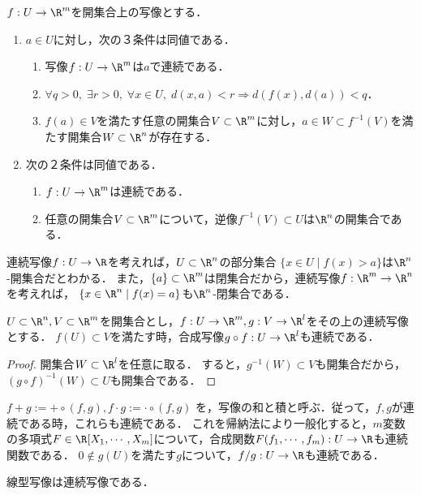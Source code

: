 \documentclass[uplatex,dvipdfmx]{jsreport}
\begin{document}
\begin{proposition}[連続写像の特徴付け]\label{prop-characterization-of-continuous-map-in-metric-spaces}
    $f:U\to\R^m$を開集合上の写像とする．
    \begin{enumerate}
        \item $a\in U$に対し，次の３条件は同値である．
        \begin{enumerate}[(1)]
            \item 写像$f:U\to\R^m$は$a$で連続である．
            \item $\forall q>0,\;\exists r>0,\; \forall x\in U,\; d(x,a)<r\Rightarrow d(f(x),d(a))<q$．
            \item $f(a)\in V$を満たす任意の開集合$V\subset\R^m$に対し，$a\in W\subset f^{-1}(V)$を満たす開集合$W\subset\R^n$が存在する．
        \end{enumerate}
        \item  次の２条件は同値である．
        \begin{enumerate}[(1)]
            \item $f:U\to\R^m$は連続である．
            \item 任意の開集合$V\subset\R^m$について，逆像$f^{-1}(V)\subset U$は$\R^n$の開集合である．
        \end{enumerate}
    \end{enumerate}
\end{proposition}
\begin{remark}
    連続写像$f:U\to\R$を考えれば，$U\subset\R^n$の部分集合
    $\{x\in U\mid f(x)>a\}$は$\R^n$-開集合だとわかる．
    また，$\{a\}\subset\R^m$は閉集合だから，連続写像$f:\R^m\to\R^n$を考えれば，
    $\{x\in\R^n\mid f(x)=a\}$も$\R^n$-閉集合である．
\end{remark}

\begin{corollary}
    $U\subset\R^n,V\subset\R^m$を開集合とし，$f:U\to\R^m,g:V\to\R^l$をその上の連続写像とする．
    $f(U)\subset V$を満たす時，合成写像$g\circ f:U\to\R^l$も連続である．
\end{corollary}
\begin{proof}
    開集合$W\subset\R^l$を任意に取る．
    すると，$g^{-1}(W)\subset V$も開集合だから，$(g\circ f)^{-1}(W)\subset U$も開集合である．
\end{proof}

\begin{example}
    $f+g:=+\circ(f,g), f\cdot g:=\cdot\circ(f,g)$
    を，写像の和と積と呼ぶ．従って，$f,g$が連続である時，これらも連続である．
    これを帰納法により一般化すると，$m$変数の多項式$F\in\R[X_1,\cdots,X_m]$について，合成関数$F(f_1,\cdots,f_m):U\to\R$も連続関数である．
    $0\notin g(U)$を満たす$g$について，$f/g:U\to\R$も連続である．
\end{example}
\begin{example}
    線型写像は連続写像である．
\end{example}
\end{document}

